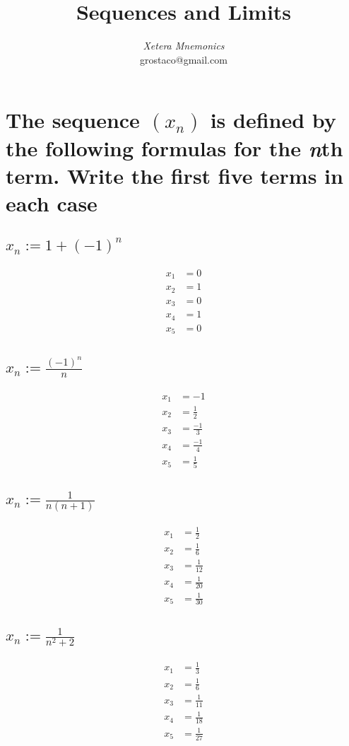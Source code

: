 \documentclass{article}
\begin{document}
\author{\textit{Xetera Mnemonics}\\\small{grostaco@gmail.com}}
\title{Sequences and Limits}
\maketitle

\section{The sequence $(x_n)$ is defined by the following formulas for the \textit{n}th term. Write the first five terms in each case}
\subsection{$x_n := 1 + (-1)^n$}

\begin{align*}
    x_1 & = 0 \\
    x_2 & = 1 \\
    x_3 & = 0 \\
    x_4 & = 1 \\
    x_5 & = 0
\end{align*}

\subsection{$x_n := \frac{(-1)^n}{n}$}

\begin{align*}
    x_1 & = -1 \\
    x_2 & = \frac{1}{2} \\
    x_3 & = \frac{-1}{3} \\
    x_4 & = \frac{-1}{4} \\
    x_5 & = \frac{1}{5}  
\end{align*}

\subsection{$x_n := \frac{1}{n(n + 1)}$}
\begin{align*}
    x_1 & = \frac{1}{2} \\
    x_2 & = \frac{1}{6} \\
    x_3 & = \frac{1}{12} \\
    x_4 & = \frac{1}{20} \\
    x_5 & = \frac{1}{30}  
\end{align*}

\subsection{$x_n := \frac{1}{n^2 + 2}$}
\begin{align*}
    x_1 & = \frac{1}{3} \\
    x_2 & = \frac{1}{6} \\
    x_3 & = \frac{1}{11} \\
    x_4 & = \frac{1}{18} \\
    x_5 & = \frac{1}{27}  
\end{align*}
\end{document}
